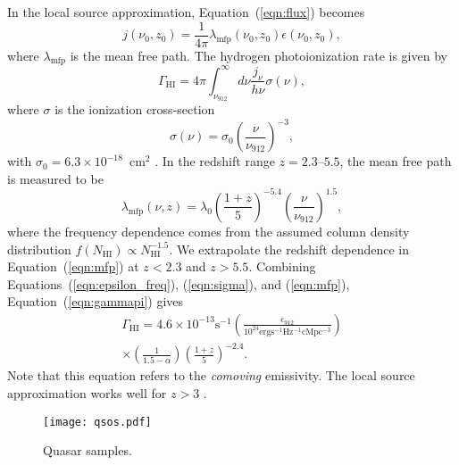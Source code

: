 \documentclass[a4paper,fleqn,usenatbib]{mnras}
\begin{document}
In the local source approximation, Equation~(\ref{eqn:flux}) becomes
\begin{equation}
  j(\nu_0, z_0) = \frac{1}{4\pi}\lambda_\mathrm{mfp}(\nu_0, z_0)\epsilon(\nu_0, z_0),
\end{equation}
where $\lambda_\mathrm{mfp}$ is the mean free path.  The hydrogen
photoionization rate is given by
\begin{equation}
  \Gamma_\mathrm{HI}=4\pi\int_{\nu_{912}}^\infty d\nu \frac{j_\nu}{h\nu} \sigma(\nu),
  \label{eqn:gammapi}
\end{equation}
where $\sigma$ is the ionization cross-section
\begin{equation}
  \sigma(\nu) = \sigma_0\left(\frac{\nu}{\nu_{912}}\right)^{-3},
  \label{eqn:sigma}
\end{equation}
with $\sigma_0=6.3\times 10^{-18}$~cm$^2$ \citep{2006agna.book.....O}.
In the redshift range $z=2.3$--$5.5$, the mean free path is measured
to be \citep{2014MNRAS.445.1745W}
\begin{equation}
  \lambda_\mathrm{mfp}(\nu, z)= \lambda_0\left(\frac{1+z}{5}\right)^{-5.4}\left(\frac{\nu}{\nu_{912}}\right)^{1.5},
  \label{eqn:mfp}
\end{equation}
where the frequency dependence comes from the assumed column density
distribution $f(N_\mathrm{HI})\propto N_\mathrm{HI}^{-1.5}$.  We
extrapolate the redshift dependence in Equation~(\ref{eqn:mfp}) at
$z<2.3$ and $z>5.5$.  Combining Equations~(\ref{eqn:epsilon_freq}),
(\ref{eqn:sigma}), and (\ref{eqn:mfp}), Equation~(\ref{eqn:gammapi})
gives
\begin{multline}
  \Gamma_\mathrm{HI}=4.6\times 10^{-13} \mathrm{s}^{-1} \left(\frac{\epsilon_{912}}{10^{24}\mathrm{erg s^{-1} Hz^{-1} cMpc^{-3}}}\right)\\
  \times\left(\frac{1}{1.5-\alpha}\right)\left(\frac{1+z}{5}\right)^{-2.4}.
\end{multline}
Note that this equation refers to the \emph{comoving} emissivity.  The
local source approximation works well for $z>3$ \citep{2013MNRAS.436.1023B}.

\begin{figure*}
  \begin{center}
    \texttt{[image: qsos.pdf]}
  \end{center}
  \caption{Quasar samples.}
  \label{fig:qsos}
\end{figure*}
\end{document}
